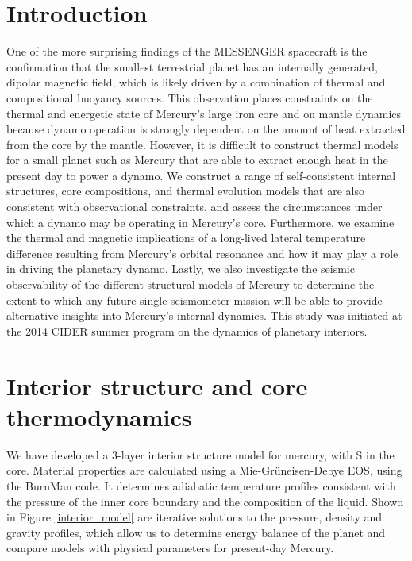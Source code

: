 \documentclass[landscape,a0b,final]{a0poster}
\begin{document}
\begin{multicols}{3}

\section*{Introduction}

One of the more surprising findings of the MESSENGER spacecraft is the confirmation that the smallest terrestrial planet has an internally generated, dipolar magnetic field, which is likely driven by a combination of thermal and compositional buoyancy sources. 
This observation places constraints on the thermal and energetic state of Mercury’s large iron core and on mantle dynamics because dynamo operation is strongly dependent on the amount of heat extracted from the core by the mantle.
However, it is difficult to construct thermal models for a small planet such as Mercury that are able to extract enough heat in the present day to power a dynamo. 
We construct a range of self-consistent internal structures, core compositions, and thermal evolution models that are also consistent with observational constraints, and assess the circumstances under which a dynamo may be operating in Mercury’s core. 
Furthermore, we examine the thermal and magnetic implications of a long-lived lateral temperature difference resulting from Mercury’s orbital resonance and how it may play a role in driving the planetary dynamo. 
Lastly, we also investigate the seismic observability of the different structural models of Mercury to determine the extent to which any future single-seismometer mission will be able to provide alternative insights into Mercury's internal dynamics.
This study was initiated at the 2014 CIDER summer program on the dynamics of planetary interiors.


\section*{Interior structure and core thermodynamics}

We have developed a 3-layer interior structure model for mercury, with S in the core.
Material properties are calculated using a Mie-Gr\"{u}neisen-Debye EOS, using the BurnMan
code. It determines adiabatic temperature profiles consistent with the pressure of the 
inner core boundary and the composition of the liquid. Shown in Figure \ref{interior_model} 
are iterative solutions to the pressure, density and gravity profiles, which allow us 
to determine energy balance of the planet and compare models with physical parameters 
for present-day Mercury.


\end{multicols}
\end{document}
